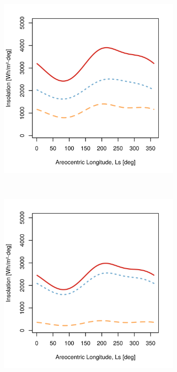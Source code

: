 \begin{figure}[h]
\begin{subfigure}[t]{\subfigureWidth}
  		\includegraphics[height=\graphicsHeight]{sections/mars-solar-energy/solar-radiation/plots/hh-hbh-and-hdh-as-a-function-of-ls-for-tau1-phi2-and-albedo-027}
  		\label{fig:sub:insolation-ls-tau-factor-1}
  	\end{subfigure}\\[0.8ex]
    \begin{subfigure}[t]{\subfigureWidth}
      \centering
  		\includegraphics[height=\graphicsHeight]{sections/mars-solar-energy/solar-radiation/plots/hh-hbh-and-hdh-as-a-function-of-ls-for-tau2-phi2-and-albedo-027}

\end{subfigure}
\end{figure}

